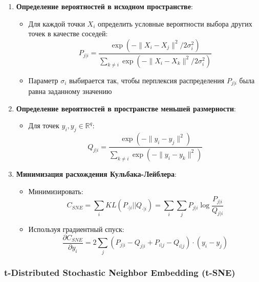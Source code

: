 \documentclass[a4paper,12pt]{article}
\begin{document}
\begin{enumerate}
    \item \textbf{Определение вероятностей в исходном пространстве}:
    \begin{itemize}
        \item Для каждой точки $X_i$ определить условные вероятности выбора других точек в качестве соседей:
        \begin{equation}
            P_{j|i} = \frac{\exp(-\|X_i - X_j\|^2/2\sigma_i^2)}{\sum_{k \neq i} \exp(-\|X_i - X_k\|^2/2\sigma_i^2)}
        \end{equation}
        \item Параметр $\sigma_i$ выбирается так, чтобы перплексия распределения $P_{j|i}$ была равна заданному значению
    \end{itemize}

    \item \textbf{Определение вероятностей в пространстве меньшей размерности}:
    \begin{itemize}
        \item Для точек $y_i, y_j \in \mathbb{R}^q$:
        \begin{equation}
            Q_{j|i} = \frac{\exp(-\|y_i - y_j\|^2)}{\sum_{k \neq i} \exp(-\|y_i - y_k\|^2)}
        \end{equation}
    \end{itemize}

    \item \textbf{Минимизация расхождения Кульбака-Лейблера}:
    \begin{itemize}
        \item Минимизировать:
        \begin{equation}
            C_{SNE} = \sum_i KL(P_{\cdot|i} || Q_{\cdot|i}) = \sum_i \sum_j P_{j|i} \log \frac{P_{j|i}}{Q_{j|i}}
        \end{equation}
        \item Используя градиентный спуск:
        \begin{equation}
            \frac{\partial C_{SNE}}{\partial y_i} = 2 \sum_j (P_{j|i} - Q_{j|i} + P_{i|j} - Q_{i|j}) \cdot (y_i - y_j)
        \end{equation}
    \end{itemize}
\end{enumerate}

\subsubsection{t-Distributed Stochastic Neighbor Embedding (t-SNE)}
\end{document}
